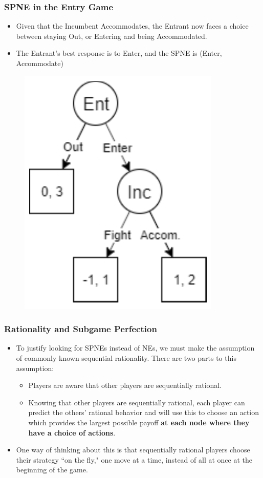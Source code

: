 \begin{frame}
\frametitle{SPNE in the Entry Game}
\begin{itemize}
\item Given that the Incumbent Accommodates, the Entrant now faces a choice between staying Out, or Entering and being Accommodated.
\item The Entrant's best response is to Enter, and the SPNE is (Enter, Accommodate)
\end{itemize}
\begin{figure}
\centering
\includegraphics[width=.4\textwidth]{figures/08InferiorEntrant.png}
\end{figure}
\end{frame}

\begin{frame}
\frametitle{Rationality and Subgame Perfection}
\begin{itemize}
	\item To justify looking for SPNEs instead of NEs, we must make the assumption of \alert{commonly known sequential rationality}. There are two parts to this assumption:
	\begin{itemize}
		\item Players are aware that other players are sequentially rational.
		\item Knowing that other players are sequentially rational, each player can predict the others' rational behavior and will use this to choose an action which provides the largest possible payoff \textbf{at each node where they have a choice of actions}.
	\end{itemize}
	\item One way of thinking about this is that sequentially rational players choose their strategy ``on the fly," one move at a time, instead of all at once at the beginning of the game.
\end{itemize}
\end{frame}

